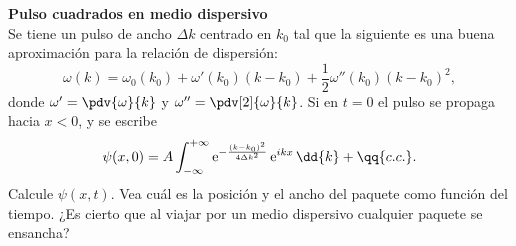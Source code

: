 \item 
\textbf{Pulso cuadrados en medio dispersivo}\\
Se tiene un pulso de ancho $\Delta k$ centrado en $k_0$ tal que la siguiente es una buena aproximación para la relación de dispersión:
\[
	\omega(k) = \omega_0 (k_0) + \omega'(k_0) (k - k_0) + \frac{1}{2} \omega'' (k_0) ( k - k_0 )^2,
\]
donde \(\omega'= \pdv{\omega}{k}\) y  \(\omega''= \pdv[2]{\omega}{k}\).
Si en $t=0$ el pulso se propaga hacia $x<0$, y se escribe
\[
	\psi(x,0) = A \int_{-\infty}^{+\infty} \operatorname{e}^{ - \frac{ ( k - k_0 )^2 }{ 4 \Delta k^2 } } \operatorname{e}^{ i k x } \dd{k} + \qq{c.c.}.
\]
Calcule $\psi(x,t)$.
Vea cuál es la posición y el ancho del paquete como función del tiempo.
¿Es cierto que al viajar por un medio dispersivo cualquier paquete se ensancha?
